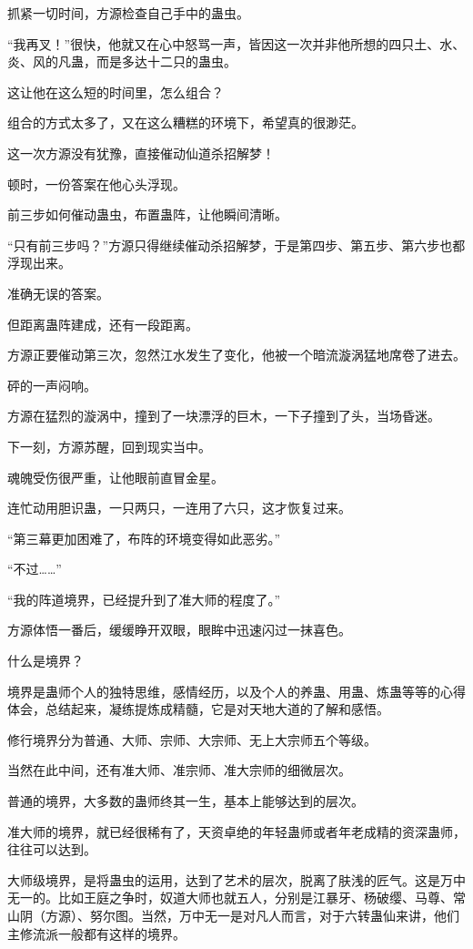 \begin{this_body}
抓紧一切时间，方源检查自己手中的蛊虫。

“我再叉！”很快，他就又在心中怒骂一声，皆因这一次并非他所想的四只土、水、炎、风的凡蛊，而是多达十二只的蛊虫。

这让他在这么短的时间里，怎么组合？

组合的方式太多了，又在这么糟糕的环境下，希望真的很渺茫。

这一次方源没有犹豫，直接催动仙道杀招解梦！

顿时，一份答案在他心头浮现。

前三步如何催动蛊虫，布置蛊阵，让他瞬间清晰。

“只有前三步吗？”方源只得继续催动杀招解梦，于是第四步、第五步、第六步也都浮现出来。

准确无误的答案。

但距离蛊阵建成，还有一段距离。

方源正要催动第三次，忽然江水发生了变化，他被一个暗流漩涡猛地席卷了进去。

砰的一声闷响。

方源在猛烈的漩涡中，撞到了一块漂浮的巨木，一下子撞到了头，当场昏迷。

下一刻，方源苏醒，回到现实当中。

魂魄受伤很严重，让他眼前直冒金星。

连忙动用胆识蛊，一只两只，一连用了六只，这才恢复过来。

“第三幕更加困难了，布阵的环境变得如此恶劣。”

“不过……”

“我的阵道境界，已经提升到了准大师的程度了。”

方源体悟一番后，缓缓睁开双眼，眼眸中迅速闪过一抹喜色。

什么是境界？

境界是蛊师个人的独特思维，感情经历，以及个人的养蛊、用蛊、炼蛊等等的心得体会，总结起来，凝练提炼成精髓，它是对天地大道的了解和感悟。

修行境界分为普通、大师、宗师、大宗师、无上大宗师五个等级。

当然在此中间，还有准大师、准宗师、准大宗师的细微层次。

普通的境界，大多数的蛊师终其一生，基本上能够达到的层次。

准大师的境界，就已经很稀有了，天资卓绝的年轻蛊师或者年老成精的资深蛊师，往往可以达到。

大师级境界，是将蛊虫的运用，达到了艺术的层次，脱离了肤浅的匠气。这是万中无一的。比如王庭之争时，奴道大师也就五人，分别是江暴牙、杨破缨、马尊、常山阴（方源）、努尔图。当然，万中无一是对凡人而言，对于六转蛊仙来讲，他们主修流派一般都有这样的境界。


\end{this_body}
